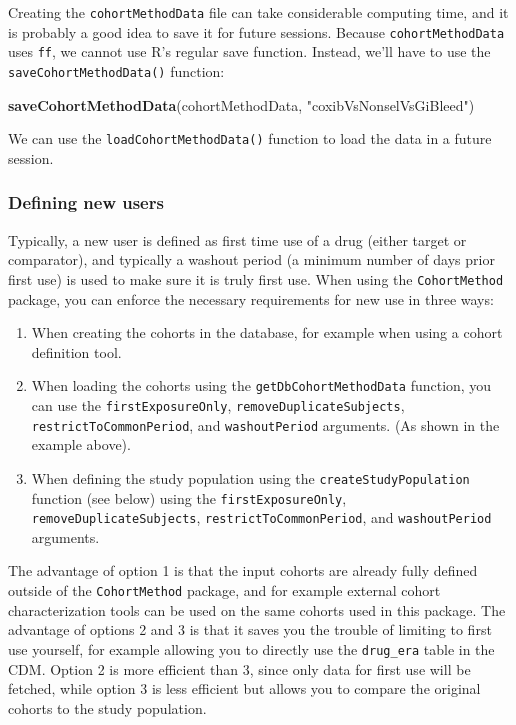\documentclass[]{article}
\newenvironment{Shaded}{\begin{snugshade}}{\end{snugshade}}
\newcommand{\KeywordTok}[1]{\textcolor[rgb]{0.13,0.29,0.53}{\textbf{#1}}}
\newcommand{\NormalTok}[1]{#1}
\newcommand{\StringTok}[1]{\textcolor[rgb]{0.31,0.60,0.02}{#1}}
\providecommand{\tightlist}{%
  \setlength{\itemsep}{0pt}\setlength{\parskip}{0pt}}
\begin{document}
Creating the \texttt{cohortMethodData} file can take considerable
computing time, and it is probably a good idea to save it for future
sessions. Because \texttt{cohortMethodData} uses \texttt{ff}, we cannot
use R's regular save function. Instead, we'll have to use the
\texttt{saveCohortMethodData()} function:

\begin{Shaded}
\begin{Highlighting}[]
\KeywordTok{saveCohortMethodData}\NormalTok{(cohortMethodData, }\StringTok{"coxibVsNonselVsGiBleed"}\NormalTok{)}
\end{Highlighting}
\end{Shaded}

We can use the \texttt{loadCohortMethodData()} function to load the data
in a future session.

\hypertarget{defining-new-users}{%
\subsubsection{Defining new users}\label{defining-new-users}}

Typically, a new user is defined as first time use of a drug (either
target or comparator), and typically a washout period (a minimum number
of days prior first use) is used to make sure it is truly first use.
When using the \texttt{CohortMethod} package, you can enforce the
necessary requirements for new use in three ways:

\begin{enumerate}
\def\labelenumi{\arabic{enumi}.}
\tightlist
\item
  When creating the cohorts in the database, for example when using a
  cohort definition tool.
\item
  When loading the cohorts using the \texttt{getDbCohortMethodData}
  function, you can use the \texttt{firstExposureOnly},
  \texttt{removeDuplicateSubjects}, \texttt{restrictToCommonPeriod}, and
  \texttt{washoutPeriod} arguments. (As shown in the example above).
\item
  When defining the study population using the
  \texttt{createStudyPopulation} function (see below) using the
  \texttt{firstExposureOnly}, \texttt{removeDuplicateSubjects},
  \texttt{restrictToCommonPeriod}, and \texttt{washoutPeriod} arguments.
\end{enumerate}

The advantage of option 1 is that the input cohorts are already fully
defined outside of the \texttt{CohortMethod} package, and for example
external cohort characterization tools can be used on the same cohorts
used in this package. The advantage of options 2 and 3 is that it saves
you the trouble of limiting to first use yourself, for example allowing
you to directly use the \texttt{drug\_era} table in the CDM. Option 2 is
more efficient than 3, since only data for first use will be fetched,
while option 3 is less efficient but allows you to compare the original
cohorts to the study population.
\end{document}
